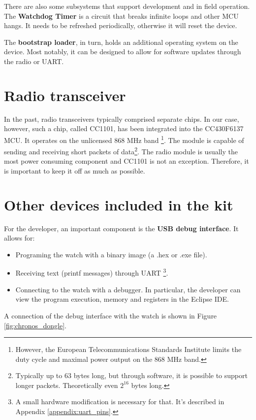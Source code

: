 There are also some subsystems that support development and in field
operation. The {\bf Watchdog Timer} is a circuit that breaks infinite
loops and other MCU hangs. It needs to be refreshed periodically,
otherwise it will reset the device.

The {\bf bootstrap loader}, in turn, holds an additional operating
system on the device.  Most notably, it can be designed to allow for
software updates through the radio or UART.

\section{Radio transceiver}

In the past, radio transceivers typically comprised separate chips. In
our case, however, such a chip, called CC1101, has been integrated into
the CC430F6137 MCU.  It operates on the unlicensed 868 MHz band
\footnote{However, the European Telecommunications Standards Institute
limits the duty cycle and maximal power output on the 868 MHz band.}.
The module is capable of sending and receiving short packets of
data\footnote{Typically up to 63 bytes long, but through software, it
is possible to support longer packets. Theoretically even $2^{16}$
bytes long.}.  The radio module is usually the most power consuming
component and CC1101 is not an exception. Therefore, it is important
to keep it off as much as possible.

\section{Other devices included in the kit}

For the developer, an important component is the {\bf USB debug
interface}. It allows for:
\begin{itemize}
  \item Programing the watch with a binary image (a .hex or .exe file).
  \item Receiving text (printf messages) through UART \footnote{A small
    hardware modification is necessary for that. It's described in
    Appendix \ref{appendix:uart_pins}.}.
  \item Connecting to the watch with a debugger. In particular, the
    developer can view the program execution, memory and registers in
    the Eclipse IDE.
\end{itemize}
A connection of the debug interface with the watch is shown in Figure
\ref{fig:chronos_dongle}.

